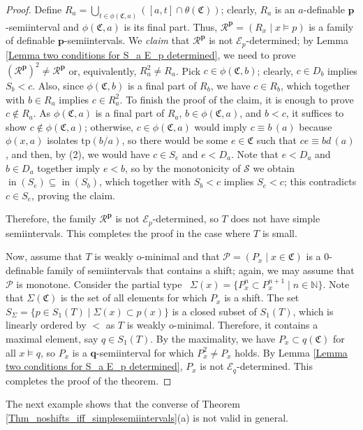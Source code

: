 \documentclass{amsart}
\theoremstyle{definition}
\theoremstyle{definition}
\newcommand{\Mon}{\mathfrak C}
\newcommand{\tp}{\mathrm{tp}}
\def\pp{\mathbf{p}}
\DeclareMathOperator{\supin}{in}
\begin{document}
\begin{proof}
Define $R_a=\bigcup_{t\in \phi(\Mon,a)}([a,t]\cap \theta(\Mon))$; clearly,  $R_a$ is an $a$-definable $\mathbf p$-semiinterval and $\phi(\Mon,a)$ is its final part. 
Thus, $\mathcal R^\pp=(R_x\mid x\models p)$ is a family of definable $\mathbf p$-semiintervals. We {\em claim} that $\mathcal R^\pp$ is not $\mathcal E_p$-determined; by Lemma \ref{Lemma two conditions for S_a E_p determined}, we need to prove $(\mathcal R^\pp)^2\neq \mathcal R^\pp$ or, equivalently, $R_a^2\neq R_a$. Pick $c\in \phi(\Mon,b)$; clearly, $c\in D_b$ implies $S_b<c$. Also, since $\phi(\Mon,b)$ is a final part of $R_b$, we have $c\in R_b$, which together with $b\in R_a$ implies $c\in R_a^2$. To finish the proof of the claim, it is enough to prove $c\notin R_a$. As $\phi(\Mon,a)$ is a final part of $R_a$, $b\in \phi(\Mon,a)$, and $b<c$, it suffices to show $c\notin\phi(\Mon,a)$; otherwise, $c\in\phi(\Mon,a)$ would imply $c\equiv b\,(a)$ because $\phi(x,a)$ isolates $\tp(b/a)$, so there would be some $e\in\Mon$ such that $ce\equiv bd\,(a)$, and then, by (2), we would have $c\in S_e$ and $e<D_a$. Note that $e<D_a$ and $b\in D_a$ together imply $e<b$, so by the monotonicity of $\mathcal S$ we obtain $\supin (S_e)\subseteq \supin (S_b)$, which together with $S_b<c$ implies $S_e<c$; this contradicts $c\in S_e$, proving the claim.

Therefore, the family $\mathcal R^\pp$ is not $\mathcal E_p$-determined, so $T$ does not have simple semiintervals. This completes the proof in the case where $T$ is small.

Now, assume that $T$ is weakly o-minimal and that $\mathcal P=(P_x\mid x\in\Mon)$ is a 0-definable family of semiintervals that contains a shift; again, we may assume that $\mathcal P$ is monotone. Consider the partial type \ $\Sigma(x)=\{P_x^n\subset P_x^{n+1}\mid n\in\mathbb N\}$. Note that $\Sigma(\Mon)$ is the set of all elements for which $P_x$ is a shift. The set $S_{\Sigma}=\{p\in S_1(T)\mid \Sigma(x)\subset p(x)\}$ is a closed subset of $S_1(T)$, which is linearly ordered by $<$ as $T$ is weakly o-minimal. Therefore, it contains a maximal element, say $q\in S_1(T)$. By the maximality, we have $P_x\subset q(\Mon)$ for all $x\models q$, so $P_x$ is a $\mathbf q$-semiinterval for which $P_x^2\neq P_x$ holds. By Lemma \ref{Lemma two conditions for S_a E_p determined}, $P_x$ is not $\mathcal E_q$-determined. This completes the proof of the theorem. 
\end{proof}



The next example shows that the converse of Theorem \ref{Thm_noshifts_iff_simplesemiintervals}(a) is not valid in general.  
\end{document}
